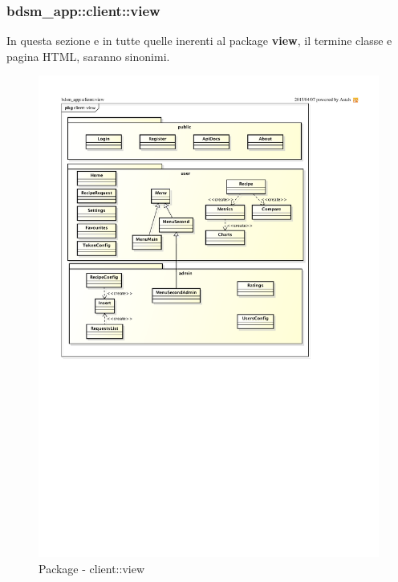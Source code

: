 %
%


\subsubsection{bdsm\_app::client::view} %
\label{ssub:bdsm_app_client_view}
In questa sezione e in tutte quelle inerenti al package \textbf{view}, il termine classe e pagina HTML, saranno sinonimi.
\begin{figure}[htbp]
	\centering
	\centerline{\includegraphics[scale=1.10]{./images/client_view.pdf}}
	\caption{Package - client::view}
\end{figure}

